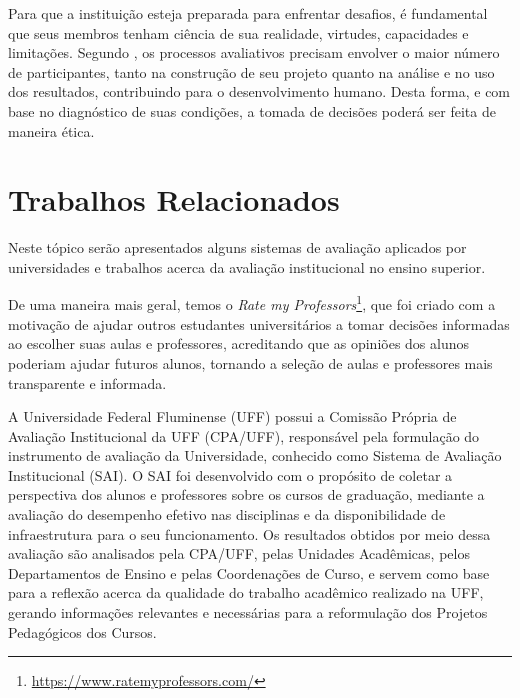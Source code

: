 Para que a instituição esteja preparada para enfrentar desafios, é fundamental que seus membros tenham ciência de sua realidade, virtudes, capacidades e limitações.
Segundo , os processos avaliativos precisam envolver o maior número de participantes, tanto na construção de seu projeto quanto na análise e no uso dos resultados, contribuindo para o desenvolvimento humano. Desta forma, e com base no diagnóstico de suas condições, a tomada de decisões poderá ser feita de maneira ética. 




\section{Trabalhos Relacionados}
Neste tópico serão apresentados alguns sistemas de avaliação aplicados por universidades e trabalhos acerca da avaliação institucional no ensino superior.

De uma maneira mais geral, temos o \textit{Rate my Professors}\footnote{\url{https://www.ratemyprofessors.com/}}, que foi criado
com a motivação de ajudar outros estudantes universitários a tomar decisões informadas ao escolher suas aulas e professores, acreditando que as opiniões dos alunos poderiam ajudar futuros alunos, tornando a seleção de aulas e professores mais transparente e informada.

A Universidade Federal Fluminense (UFF) possui a Comissão Própria de Avaliação Institucional da UFF (CPA/UFF),
responsável pela formulação do instrumento de avaliação da Universidade, conhecido como Sistema de Avaliação Institucional (SAI).
O SAI foi desenvolvido com o propósito de coletar a perspectiva dos alunos e professores sobre os cursos de graduação,
mediante a avaliação do desempenho efetivo nas disciplinas e da disponibilidade de infraestrutura para o seu funcionamento.
Os resultados obtidos por meio dessa avaliação são analisados pela CPA/UFF, pelas Unidades Acadêmicas, pelos Departamentos de Ensino e pelas Coordenações de Curso,
e servem como base para a reflexão acerca da qualidade do trabalho acadêmico realizado na UFF, gerando informações relevantes e necessárias para a reformulação dos Projetos Pedagógicos dos Cursos.





